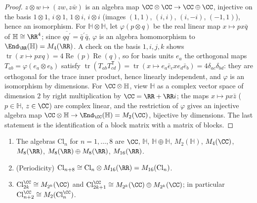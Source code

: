\begin{proof}
$z \otimes w \mapsto (zw, z\bar{w})$ is an algebra map $\CC \otimes \CC \to \CC \oplus \CC$, injective on the basis $1 \otimes 1$, $i \otimes 1$, $1 \otimes i$, $i \otimes i$ (images $(1, 1)$, $(i, i)$, $(i, -i)$, $(-1, 1)$), hence an
isomorphism. For $\mathbb{H} \otimes \mathbb{H}$, let $\varphi(p \otimes q)$ be the real linear map $x \mapsto px\bar{q}$ of $\mathbb{H} \cong \RR^4$; since $\overline{qq^{\prime}} = \bar{q}^{\prime}\bar{q}$, $\varphi$ is an algebra
homomorphism to $\End_\RR(\mathbb{H}) = M_4(\RR)$. A check on the basis $1, i, j, k$ shows $\operatorname{tr}(x \mapsto pxq) = 4\operatorname{Re}(p)\operatorname{Re}(q)$, so for basis units $e_a$ the orthogonal maps
$T_{ab} = \varphi(e_a \otimes e_b)$ satisfy $\operatorname{tr}(T_{ab}T_{cd}^{\mathsf{T}}) = \operatorname{tr}(x \mapsto e_a\bar{e}_cxe_d\bar{e}_b) = 4\delta_{ac}\delta_{bd}$: they are orthogonal for the trace inner product,
hence linearly independent, and $\varphi$ is an isomorphism by dimensions. For $\CC \otimes \mathbb{H}$, view $\mathbb{H}$ as a complex vector space of dimension $2$ by right multiplication by $\CC = \RR + \RR i$; the
maps $x \mapsto px\bar{z}$ ($p \in \mathbb{H}$, $z \in \CC$) are complex linear, and the restriction of $\varphi$ gives an injective algebra map $\CC \otimes \mathbb{H} \to \End_\CC(\mathbb{H}) = M_2(\CC)$, bijective by
dimensions. The last statement is the identification of a block matrix with a matrix of blocks.
\end{proof}

\begin{theorem}\label{spin-geometry:theorem-classification}
\begin{enumerate}
\item The algebras $\mathrm{Cl}_n$ for $n = 1, \ldots, 8$ are
$\CC$, $\mathbb{H}$, $\mathbb{H} \oplus \mathbb{H}$, $M_2(\mathbb{H})$, $M_4(\CC)$, $M_8(\RR)$, $M_8(\RR) \oplus M_8(\RR)$, $M_{16}(\RR)$.
\item (Periodicity) $\mathrm{Cl}_{n+8} \cong \mathrm{Cl}_n \otimes M_{16}(\RR) = M_{16}(\mathrm{Cl}_n)$.
\item $\mathrm{Cl}^\CC_{2k} \cong M_{2^k}(\CC)$ and $\mathrm{Cl}^\CC_{2k+1} \cong M_{2^k}(\CC) \oplus M_{2^k}(\CC)$; in particular $\mathrm{Cl}^\CC_{n+2} \cong M_2(\mathrm{Cl}^\CC_n)$.
\end{enumerate}
\end{theorem}

